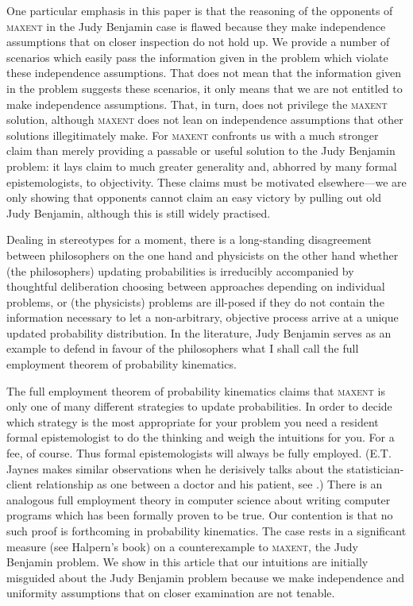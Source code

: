 \documentclass[12pt]{article}
\begin{document}
One particular emphasis in this paper is that the reasoning of the
opponents of \textsc{maxent} in the Judy Benjamin case is flawed
because they make independence assumptions that on closer inspection
do not hold up. We provide a number of scenarios which easily pass the
information given in the problem which violate these independence
assumptions. That does not mean that the information given in the
problem suggests these scenarios, it only means that we are not
entitled to make independence assumptions. That, in turn, does not
privilege the \textsc{maxent} solution, although \textsc{maxent} does
not lean on independence assumptions that other solutions
illegitimately make. For \textsc{maxent} confronts us with a much
stronger claim than merely providing a passable or useful solution to
the Judy Benjamin problem: it lays claim to much greater generality
and, abhorred by many formal epistemologists, to objectivity. These
claims must be motivated elsewhere---we are only showing that
opponents cannot claim an easy victory by pulling out old Judy
Benjamin, although this is still widely practised.

Dealing in stereotypes for a moment, there is a long-standing
disagreement between philosophers on the one hand and physicists on
the other hand whether (the philosophers) updating probabilities is
irreducibly accompanied by thoughtful deliberation choosing between
approaches depending on individual problems, or (the physicists)
problems are ill-posed if they do not contain the information
necessary to let a non-arbitrary, objective process arrive at a
unique updated probability distribution. In the literature, Judy
Benjamin serves as an example to defend in favour of the philosophers
what I shall call the full employment theorem of probability
kinematics.

The full employment theorem of probability kinematics claims that
\textsc{maxent} is only one of many different strategies to update
probabilities. In order to decide which strategy is the most
appropriate for your problem you need a resident formal epistemologist
to do the thinking and weigh the intuitions for you. For a fee, of
course. Thus formal epistemologists will always be fully employed.
(E.T. Jaynes makes similar observations when he derisively talks about
the statistician-client relationship as one between a doctor and his
patient, see .) There is an analogous
full employment theory in computer science about writing computer
programs which has been formally proven to be true. Our contention is
that no such proof is forthcoming in probability kinematics. The case
rests in a significant measure (see Halpern's book) on a
counterexample to \textsc{maxent}, the Judy Benjamin problem. We show
in this article that our intuitions are initially misguided about the
Judy Benjamin problem because we make independence and uniformity
assumptions that on closer examination are not tenable.
\end{document}
